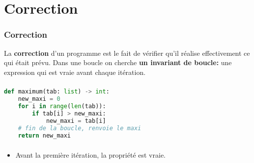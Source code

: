 \documentclass[svgnames,11pt]{beamer}
\begin{document}
\section{Correction}
\begin{frame}
    \frametitle{Correction}

    \begin{aretenir}[]
    La \textbf{correction} d'un programme est le fait de vérifier qu'il réalise effectivement ce qui était prévu. Dans une boucle on cherche \textbf{un invariant de boucle:} une expression qui est vraie avant chaque itération.
    \end{aretenir}

\end{frame}
\begin{frame}[fragile]
    \frametitle{}

    \begin{center}
        \begin{lstlisting}[language=Python , basicstyle=\ttfamily\small, xleftmargin=2em, xrightmargin=2em]
def maximum(tab: list) -> int:
    new_maxi = 0
    for i in range(len(tab)):
        if tab[i] > new_maxi:
            new_maxi = tab[i]
    # fin de la boucle, renvoie le maxi
    return new_maxi
\end{lstlisting}
        \label{CODE}
    \end{center}   

\end{frame}
\begin{frame}
    \frametitle{}

    \begin{center}
    \end{center}
\begin{itemize}
    \item Avant la première itération, la propriété est vraie.
\end{itemize}
\end{frame}
\end{document}
